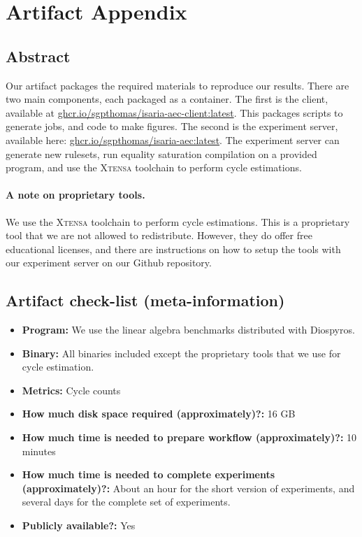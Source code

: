 \documentclass{sigplanconf}
\begin{document}


\appendix
\section{Artifact Appendix}

\subsection{Abstract}

Our artifact packages the required materials to reproduce our results. There are two main components, each packaged as a container. The first is the client, available at \url{ghcr.io/sgpthomas/isaria-aec-client:latest}. This packages scripts to generate jobs, and code to make figures. The second is the experiment server, available here: \url{ghcr.io/sgpthomas/isaria-aec:latest}. The experiment server can generate new rulesets, run equality saturation compilation on a provided program, and use the \textsc{Xtensa} toolchain to perform cycle estimations.

\paragraph{A note on proprietary tools.} We use the \textsc{Xtensa} toolchain to perform cycle estimations. This is a proprietary tool that we are not allowed to redistribute. However, they do offer free educational licenses, and there are instructions on how to setup the tools with our experiment server on our Github repository.

\subsection{Artifact check-list (meta-information)}

{\small
\begin{itemize}
  \item {\bf Program: } We use the linear algebra benchmarks distributed with Diospyros.
  \item {\bf Binary: } All binaries included except the proprietary tools that we use for cycle estimation.
  \item {\bf Metrics: } Cycle counts
  \item {\bf How much disk space required (approximately)?: } 16 GB
  \item {\bf How much time is needed to prepare workflow (approximately)?: } 10 minutes
  \item {\bf How much time is needed to complete experiments (approximately)?: } About an hour for the short version of experiments, and several days for the complete set of experiments.
  \item {\bf Publicly available?: } Yes
\end{itemize}
}
\end{document}
